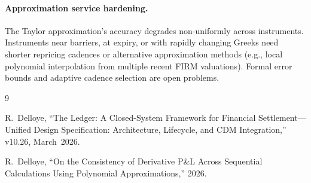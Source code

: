 \documentclass[11pt,a4paper]{article}
\begin{document}
\paragraph{Approximation service hardening.}  The Taylor approximation's accuracy degrades non-uniformly across instruments.  Instruments near barriers, at expiry, or with rapidly changing Greeks need shorter repricing cadences or alternative approximation methods (e.g., local polynomial interpolation from multiple recent FIRM valuations).  Formal error bounds and adaptive cadence selection are open problems.

\clearpage
\begin{thebibliography}{9}

R.~Delloye, ``The Ledger: A Closed-System Framework for Financial Settlement---Unified Design Specification: Architecture, Lifecycle, and CDM Integration,'' v10.26, March~2026.

R.~Delloye, ``On the Consistency of Derivative P\&L Across Sequential Calculations Using Polynomial Approximations,'' 2026.

\end{thebibliography}
\end{document}
